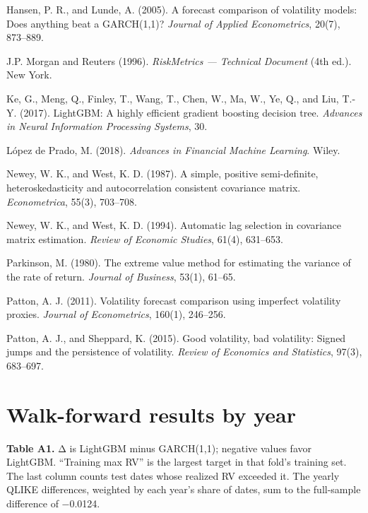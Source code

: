 \documentclass[11pt]{article}
\begin{document}
\begin{list}{}{\setlength{\leftmargin}{1.5em}\setlength{\itemindent}{-1.5em}\setlength{\itemsep}{2pt}\setlength{\parsep}{0pt}}
\item Hansen, P. R., and Lunde, A. (2005). A forecast comparison of volatility
models: Does anything beat a GARCH(1,1)? \emph{Journal of Applied
Econometrics}, 20(7), 873--889.

\item J.P. Morgan and Reuters (1996). \emph{RiskMetrics --- Technical Document} (4th
ed.). New York.

\item Ke, G., Meng, Q., Finley, T., Wang, T., Chen, W., Ma, W., Ye, Q., and Liu,
T.-Y. (2017). LightGBM: A highly efficient gradient boosting decision
tree. \emph{Advances in Neural Information Processing Systems}, 30.

\item López de Prado, M. (2018). \emph{Advances in Financial Machine Learning}. Wiley.

\item Newey, W. K., and West, K. D. (1987). A simple, positive semi-definite,
heteroskedasticity and autocorrelation consistent covariance matrix.
\emph{Econometrica}, 55(3), 703--708.

\item Newey, W. K., and West, K. D. (1994). Automatic lag selection in
covariance matrix estimation. \emph{Review of Economic Studies}, 61(4),
631--653.

\item Parkinson, M. (1980). The extreme value method for estimating the variance
of the rate of return. \emph{Journal of Business}, 53(1), 61--65.

\item Patton, A. J. (2011). Volatility forecast comparison using imperfect
volatility proxies. \emph{Journal of Econometrics}, 160(1), 246--256.

\item Patton, A. J., and Sheppard, K. (2015). Good volatility, bad volatility:
Signed jumps and the persistence of volatility. \emph{Review of Economics and
Statistics}, 97(3), 683--697.

\end{list}

\appendix

\hypertarget{walk-forward-results-by-year}{%
\section{Walk-forward results by year}\label{walk-forward-results-by-year}}

\textbf{Table A1.} Δ is LightGBM minus GARCH(1,1); negative values favor
LightGBM. ``Training max RV'' is the largest target in that fold's training
set. The last column counts test dates whose realized RV exceeded it. The
yearly QLIKE differences, weighted by each year's share of dates, sum to
the full-sample difference of −0.0124.
\end{document}
